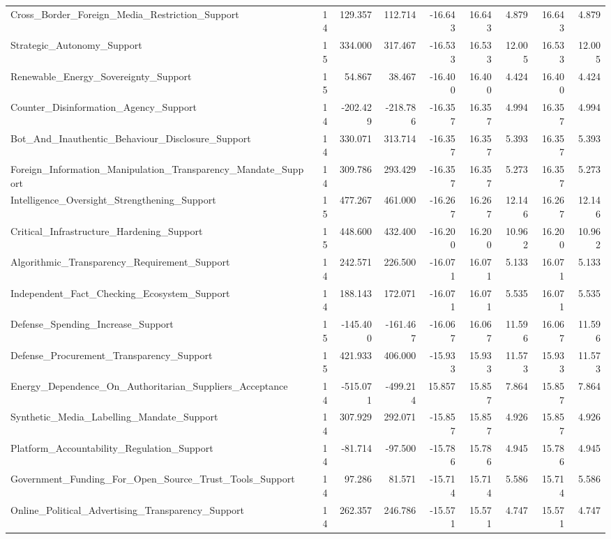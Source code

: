 \begin{table}[htbp]
\begin{threeparttable}
\begin{adjustbox}{max width=\linewidth}
\begin{tabular}{lrrrrrrrr}
Cross\_Border\_Foreign\_Media\_Restriction\_Support & 14 & 129.357 & 112.714 & -16.643 & 16.643 & 4.879 & 16.643 & 4.879 \\
Strategic\_Autonomy\_Support & 15 & 334.000 & 317.467 & -16.533 & 16.533 & 12.005 & 16.533 & 12.005 \\
Renewable\_Energy\_Sovereignty\_Support & 15 & 54.867 & 38.467 & -16.400 & 16.400 & 4.424 & 16.400 & 4.424 \\
Counter\_Disinformation\_Agency\_Support & 14 & -202.429 & -218.786 & -16.357 & 16.357 & 4.994 & 16.357 & 4.994 \\
Bot\_And\_Inauthentic\_Behaviour\_Disclosure\_Support & 14 & 330.071 & 313.714 & -16.357 & 16.357 & 5.393 & 16.357 & 5.393 \\
Foreign\_Information\_Manipulation\_Transparency\_Mandate\_Support & 14 & 309.786 & 293.429 & -16.357 & 16.357 & 5.273 & 16.357 & 5.273 \\
Intelligence\_Oversight\_Strengthening\_Support & 15 & 477.267 & 461.000 & -16.267 & 16.267 & 12.146 & 16.267 & 12.146 \\
Critical\_Infrastructure\_Hardening\_Support & 15 & 448.600 & 432.400 & -16.200 & 16.200 & 10.962 & 16.200 & 10.962 \\
Algorithmic\_Transparency\_Requirement\_Support & 14 & 242.571 & 226.500 & -16.071 & 16.071 & 5.133 & 16.071 & 5.133 \\
Independent\_Fact\_Checking\_Ecosystem\_Support & 14 & 188.143 & 172.071 & -16.071 & 16.071 & 5.535 & 16.071 & 5.535 \\
Defense\_Spending\_Increase\_Support & 15 & -145.400 & -161.467 & -16.067 & 16.067 & 11.596 & 16.067 & 11.596 \\
Defense\_Procurement\_Transparency\_Support & 15 & 421.933 & 406.000 & -15.933 & 15.933 & 11.573 & 15.933 & 11.573 \\
Energy\_Dependence\_On\_Authoritarian\_Suppliers\_Acceptance & 14 & -515.071 & -499.214 & 15.857 & 15.857 & 7.864 & 15.857 & 7.864 \\
Synthetic\_Media\_Labelling\_Mandate\_Support & 14 & 307.929 & 292.071 & -15.857 & 15.857 & 4.926 & 15.857 & 4.926 \\
Platform\_Accountability\_Regulation\_Support & 14 & -81.714 & -97.500 & -15.786 & 15.786 & 4.945 & 15.786 & 4.945 \\
Government\_Funding\_For\_Open\_Source\_Trust\_Tools\_Support & 14 & 97.286 & 81.571 & -15.714 & 15.714 & 5.586 & 15.714 & 5.586 \\
Online\_Political\_Advertising\_Transparency\_Support & 14 & 262.357 & 246.786 & -15.571 & 15.571 & 4.747 & 15.571 & 4.747 \\

\end{tabular}
\end{adjustbox}
\end{threeparttable}
\end{table}
